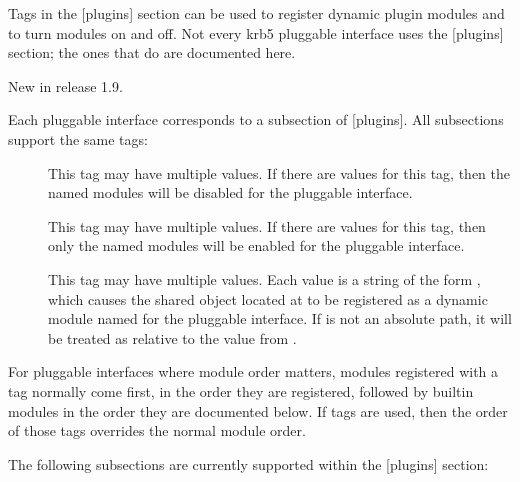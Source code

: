 \documentclass[letterpaper,10pt,english]{sphinxmanual}
\begin{document}
\sphinxAtStartPar
Tags in the {[}plugins{]} section can be used to register dynamic plugin
modules and to turn modules on and off.  Not every krb5 pluggable
interface uses the {[}plugins{]} section; the ones that do are documented
here.

\sphinxAtStartPar
New in release 1.9.

\sphinxAtStartPar
Each pluggable interface corresponds to a subsection of {[}plugins{]}.
All subsections support the same tags:
\begin{description}
\item[{}] \leavevmode
\sphinxAtStartPar
This tag may have multiple values. If there are values for this
tag, then the named modules will be disabled for the pluggable
interface.

\item[{}] \leavevmode
\sphinxAtStartPar
This tag may have multiple values. If there are values for this
tag, then only the named modules will be enabled for the pluggable
interface.

\item[{}] \leavevmode
\sphinxAtStartPar
This tag may have multiple values.  Each value is a string of the
form , which causes the shared object
located at  to be registered as a dynamic module named
 for the pluggable interface.  If  is not an
absolute path, it will be treated as relative to the
 value from {\hyperref[\detokenize{admin/conf_files/krb5_conf:libdefaults}]{}}.

\end{description}

\sphinxAtStartPar
For pluggable interfaces where module order matters, modules
registered with a  tag normally come first, in the order
they are registered, followed by built\sphinxhyphen{}in modules in the order they
are documented below.  If  tags are used, then the
order of those tags overrides the normal module order.

\sphinxAtStartPar
The following subsections are currently supported within the {[}plugins{]}
section:
\end{document}
